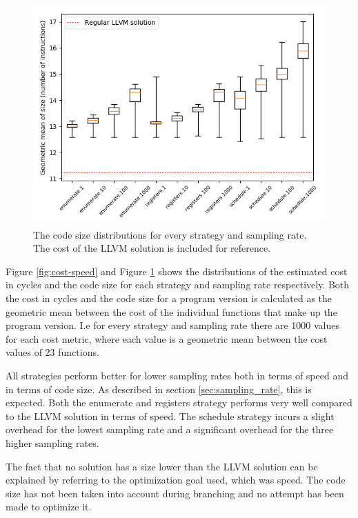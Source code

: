 \begin{figure}[h]
	\centering
	\includegraphics[width=\textwidth,height=0.5\textheight]{results/figures/cost_size}
	\caption{The code size distributions for every strategy and sampling rate. The cost of the LLVM solution is included for reference.}
	\label{fig:cost-size}
\end{figure}

Figure \ref{fig:cost-speed} and Figure \ref{fig:cost-size} shows the distributions of the
estimated cost in cycles and the code size for each strategy and sampling rate
respectively. Both the cost in cycles and the code size for a program version is
calculated as the geometric mean between the cost of the individual functions that make
up the program version. I.e for every strategy and sampling rate there are 1000 values for
each cost metric, where each value is a geometric mean between the cost values of 23
functions.

All strategies perform better for lower sampling rates both in terms of speed and in terms
of code size. As described in section \ref{sec:sampling_rate}, this is expected. Both the
enumerate and registers strategy performs very well compared to the LLVM solution
in terms of speed. The schedule strategy incurs a slight overhead for the lowest sampling
rate and a significant overhead for the three higher sampling rates.

The fact that no solution has a size lower than the LLVM solution can be explained by
referring to the optimization goal used, which was speed. The code size has not been taken
into account during branching and no attempt has been made to optimize it.


